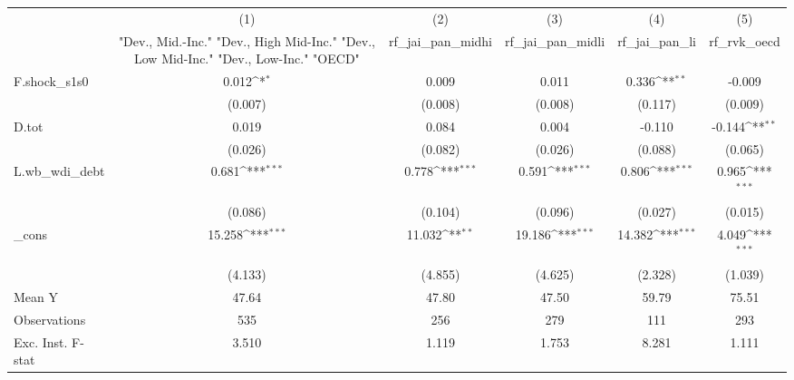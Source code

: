 {
\def\sym#1{\ifmmode^{#1}\else\(^{#1}\)\fi}
\begin{tabular}{l*{5}{c}}
\toprule
            &\multicolumn{1}{c}{(1)}&\multicolumn{1}{c}{(2)}&\multicolumn{1}{c}{(3)}&\multicolumn{1}{c}{(4)}&\multicolumn{1}{c}{(5)}\\
            &\multicolumn{1}{c}{ "Dev., Mid.-Inc." "Dev., High Mid-Inc." "Dev., Low Mid-Inc." "Dev., Low-Inc." "OECD" }&\multicolumn{1}{c}{rf\_jai\_pan\_midhi}&\multicolumn{1}{c}{rf\_jai\_pan\_midli}&\multicolumn{1}{c}{rf\_jai\_pan\_li}&\multicolumn{1}{c}{rf\_rvk\_oecd}\\
\midrule
F.shock\_s1s0&       0.012\sym{*}  &       0.009         &       0.011         &       0.336\sym{**} &      -0.009         \\
            &     (0.007)         &     (0.008)         &     (0.008)         &     (0.117)         &     (0.009)         \\
\addlinespace
D.tot       &       0.019         &       0.084         &       0.004         &      -0.110         &      -0.144\sym{**} \\
            &     (0.026)         &     (0.082)         &     (0.026)         &     (0.088)         &     (0.065)         \\
\addlinespace
L.wb\_wdi\_debt&       0.681\sym{***}&       0.778\sym{***}&       0.591\sym{***}&       0.806\sym{***}&       0.965\sym{***}\\
            &     (0.086)         &     (0.104)         &     (0.096)         &     (0.027)         &     (0.015)         \\
\addlinespace
\_cons      &      15.258\sym{***}&      11.032\sym{**} &      19.186\sym{***}&      14.382\sym{***}&       4.049\sym{***}\\
            &     (4.133)         &     (4.855)         &     (4.625)         &     (2.328)         &     (1.039)         \\
\midrule
Mean Y      &       47.64         &       47.80         &       47.50         &       59.79         &       75.51         \\
Observations&         535         &         256         &         279         &         111         &         293         \\
Exc. Inst. F-stat&       3.510         &       1.119         &       1.753         &       8.281         &       1.111         \\
\bottomrule
\end{tabular}
}
